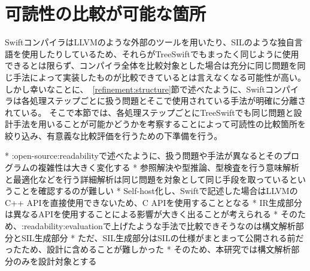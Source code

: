 \section{可読性の比較が可能な箇所}
\label{refinement:comperable}

SwiftコンパイラはLLVMのような外部のツールを用いたり、SILのような独自言語を使用したりしているため、それらがTreeSwiftでもまったく同じように使用できるとは限らず、コンパイラ全体を比較対象とした場合は充分に同じ問題を同じ手法によって実装したものが比較できているとは言えなくなる可能性が高い。
しかし幸いなことに、~\ref{refinement:structure}節で述べたように、Swiftコンパイラは各処理ステップごとに扱う問題とそこで使用されている手法が明確に分離されている。
そこで本節では、各処理ステップごとにTreeSwiftでも同じ問題と設計手法を用いることが可能かどうかを考察することによって可読性の比較箇所を絞り込み、有意義な比較評価を行うための下準備を行う。

* :open-source:readabilityで述べたように、扱う問題や手法が異なるとそのプログラムの複雑性は大きく変化する
* 参照解決や型推論、型検査を行う意味解析と最適化などを行う詳細解析は同じ問題を対象として同じ手段を取っているということを確認するのが難しい
* Self-host化し、Swiftで記述した場合はLLVMのC++ APIを直接使用できないため、C APIを使用することとなる
* IR生成部分は異なるAPIを使用することによる影響が大きく出ることが考えられる
* そのため、:readability:evaluationで上げたような手法で比較できそうなのは構文解析部分とSIL生成部分
* ただ、SIL生成部分はSILの仕様がまとまって公開される前だったため、設計に含めることが難しかった
* そのため、本研究では構文解析部分のみを設計対象とする
